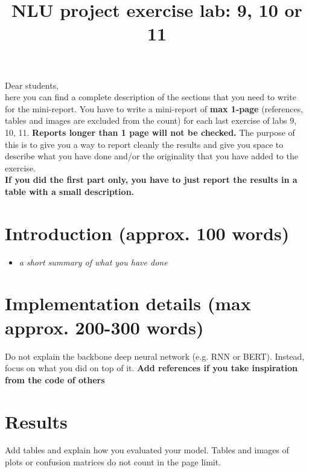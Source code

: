 \documentclass[a4paper]{article}
\title{NLU project exercise lab: 9, 10 or 11}
\begin{document}
\maketitle

Dear students, \\
here you can find a complete description of the sections that you need to write for the mini-report. You have to write a mini-report of \textbf{max 1-page} (references, tables and images are excluded from the count) for each last exercise of labs 9, 10, 11. \textbf{Reports longer than 1 page will not be checked.} The purpose of this is to give you a way to report cleanly the results and give you space to describe what you have done and/or the originality that you have added to the exercise.
\\
\textbf{If you did the first part only, you have to just report the results in a table with a small description.}

\section{Introduction (approx. 100 words)}
\begin{itemize}
    \item \textit{a short summary of what you have done}
\end{itemize}
\section{Implementation details (max approx. 200-300 words)}
Do not explain the backbone deep neural network (e.g. RNN or BERT). Instead, focus on what you did on top of it. \textbf{Add references if you take inspiration from the code of others}

\section{Results}
Add tables and explain how you evaluated your model. Tables and images of plots or confusion matrices do not count in the page limit.





\end{document}

